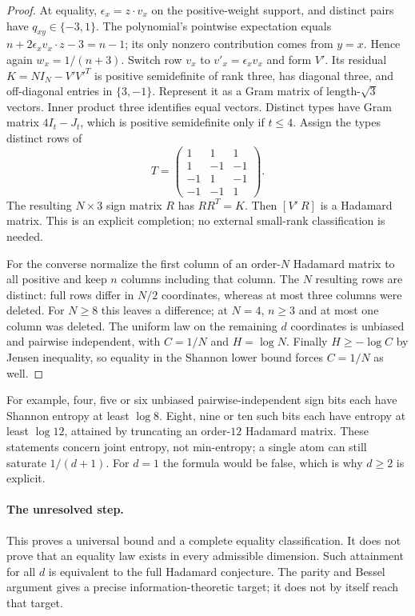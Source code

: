 \begin{proof}
At equality, $\epsilon_x=z\cdot v_x$ on the positive-weight support,
and distinct pairs have $q_{xy}\in\{-3,1\}$. The polynomial's
pointwise expectation equals
$n+2\epsilon_xv_x\cdot z-3=n-1$; its only nonzero contribution
comes from $y=x$. Hence again $w_x=1/(n+3)$.
Switch row $v_x$ to $v'_x=\epsilon_xv_x$ and form $V'$.
Its residual $K=NI_N-V'V'^T$ is positive semidefinite of rank three,
has diagonal three, and off-diagonal entries in $\{3,-1\}$.
Represent it as a Gram matrix of length-$\sqrt3$ vectors. Inner
product three identifies equal vectors. Distinct types have Gram
matrix $4I_t-J_t$, which is positive semidefinite only if $t\le4$.
Assign the types distinct rows of
\[
 T=\begin{pmatrix}1&1&1\\1&-1&-1\\-1&1&-1\\-1&-1&1\end{pmatrix}.
\]
The resulting $N\times3$ sign matrix $R$ has $RR^T=K$.
Then $[V'\ R]$ is a Hadamard matrix. This is an explicit completion;
no external small-rank classification is needed.

For the converse normalize the first column of an order-$N$ Hadamard
matrix to all positive and keep $n$ columns including that column.
The $N$ resulting rows are distinct: full rows differ in $N/2$
coordinates, whereas at most three columns were deleted. For $N\ge8$
this leaves a difference; at $N=4$, $n\ge3$ and at most one column
was deleted. The uniform law on the remaining $d$ coordinates is
unbiased and pairwise independent, with $C=1/N$ and $H=\log N$.
Finally $H\ge-\log C$ by Jensen inequality, so equality in the Shannon
lower bound forces $C=1/N$ as well.
\end{proof}

For example, four, five or six unbiased pairwise-independent sign bits
each have Shannon entropy at least $\log8$. Eight, nine or ten such
bits each have entropy at least $\log12$, attained by truncating an
order-$12$ Hadamard matrix. These statements concern joint entropy,
not min-entropy; a single atom can still saturate $1/(d+1)$.
For $d=1$ the formula would be false, which is why $d\ge2$ is explicit.

\paragraph{The unresolved step.}
This proves a universal bound and a complete equality classification.
It does not prove that an equality law exists in every admissible
dimension. Such attainment for all $d$ is equivalent to the full
Hadamard conjecture. The parity and Bessel argument gives a precise
information-theoretic target; it does not by itself reach that target.
